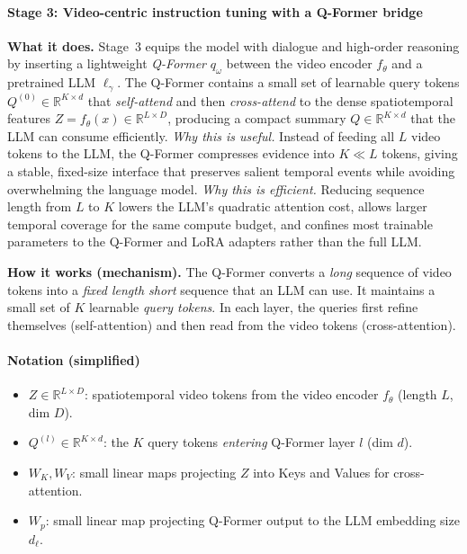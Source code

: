 \begin{enrichment}
\begin{enrichment}
        \paragraph{Stage 3: Video-centric instruction tuning with a Q-Former bridge}
        \textbf{What it does.} Stage~3 equips the model with dialogue and high-order reasoning by inserting a lightweight \emph{Q-Former} $q_\omega$ between the video encoder $f_\theta$ and a pretrained LLM $\ell_\gamma$. The Q-Former contains a small set of learnable query tokens $Q^{(0)}\!\in\!\mathbb{R}^{K\times d}$ that \emph{self-attend} and then \emph{cross-attend} to the dense spatiotemporal features $Z\!=\!f_\theta(x)\!\in\!\mathbb{R}^{L\times D}$, producing a compact summary $Q\!\in\!\mathbb{R}^{K\times d}$ that the LLM can consume efficiently. \emph{Why this is useful.} Instead of feeding all $L$ video tokens to the LLM, the Q-Former compresses evidence into $K\!\ll\!L$ tokens, giving a stable, fixed-size interface that preserves salient temporal events while avoiding overwhelming the language model. \emph{Why this is efficient.} Reducing sequence length from $L$ to $K$ lowers the LLM’s quadratic attention cost, allows larger temporal coverage for the same compute budget, and confines most trainable parameters to the Q-Former and LoRA adapters rather than the full LLM.
        
        \medskip
        \noindent
        \textbf{How it works (mechanism).} The Q-Former converts a \emph{long} sequence of video tokens into a \emph{fixed length short} sequence that an LLM can use. It maintains a small set of $K$ learnable \emph{query tokens}. In each layer, the queries first refine themselves (self-attention) and then read from the video tokens (cross-attention).
        
        \paragraph{Notation (simplified)}
        \begin{itemize}
            \item $Z \in \mathbb{R}^{L \times D}$: spatiotemporal video tokens from the video encoder $f_\theta$ (length $L$, dim $D$).
            \item $Q^{(l)} \in \mathbb{R}^{K \times d}$: the $K$ query tokens \emph{entering} Q-Former layer $l$ (dim $d$).
            \item $W_K, W_V$: small linear maps projecting $Z$ into Keys and Values for cross-attention.
            \item $W_p$: small linear map projecting Q-Former output to the LLM embedding size $d_\ell$.
        \end{itemize}
        

\end{enrichment}
\end{enrichment}
